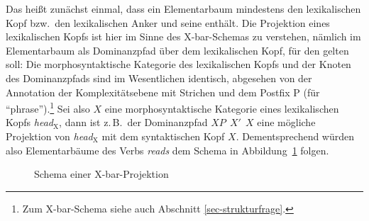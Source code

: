 Das hei\ss t zunächst einmal, dass ein Elementarbaum mindestens den lexikalischen Kopf bzw.\ den lexikalischen Anker und seine  enthält. Die Projektion eines lexikalischen Kopfs ist hier im Sinne des X-bar-Schemas \citep{Chomsky:70} zu verstehen, nämlich im Elementarbaum als Dominanzpfad über dem lexikalischen Kopf, für den gelten soll: Die morphosyntaktische Kategorie des lexikalischen Kopfs und der Knoten des Dominanzpfads sind im Wesentlichen identisch, abgesehen von der Annotation der Komplexitätsebene mit Strichen und dem Postfix P (für "`phrase"').\footnote{Zum X-bar-Schema siehe auch Abschnitt \ref{sec-strukturfrage}.} Sei also $X$ eine morphosyntaktische Kategorie eines lexikalischen Kopfs {\it head$_{\text{X}}$}, dann ist z.\,B.\ der Dominanzpfad $X\!P ~~ X' ~~ X$ eine mögliche Projektion von {\it head$_{\text{X}}$} mit dem syntaktischen Kopf $X$. Dementsprechend würden also Elementarbäume des Verbs \textit{reads} dem Schema in Abbildung~\ref{fig-cetm-1} folgen.
 
\begin{figure}[p]
\centering
{}
\caption{\label{fig-cetm-1}Schema einer X-bar-Projektion}
\end{figure}

